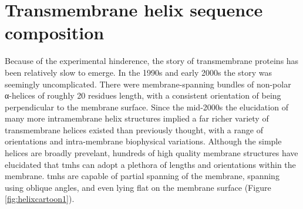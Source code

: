 \documentclass[12pt,PhD,twoside]{muthesis}
\begin{document}
\section{Transmembrane helix sequence composition}



Because of the experimental hinderence, the story of transmembrane proteins has been relatively slow to emerge. In the 1990s and early 2000s the story was seemingly uncomplicated. There were membrane-spanning bundles of non-polar α-helices of roughly 20 residues length, with a consistent orientation of being perpendicular to the membrane surface. Since the mid-2000s the elucidation of many more intramembrane helix structures implied a far richer variety of transmembrane helices existed than previously thought, with a range of orientations and intra-membrane biophysical variations. Although the simple helices are broadly prevelant, hundreds of high quality membrane structures have elucidated that \gls{tmh}s can adopt a plethora of lengths and orientations within the membrane. \gls{tmh}s are capable of partial spanning of the membrane, spanning using oblique angles, and even lying flat on the membrane surface \cite{VonHeijne2006, Elofsson2007} (Figure \ref{fig:helixcartoon1}).
\end{document}
